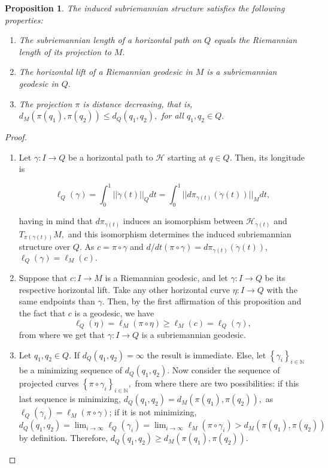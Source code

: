 \documentclass[12pt, letterpaper, reqno]{amsart}
\theoremstyle{definition}
\theoremstyle{plain}
\newtheorem{prop}{Proposition}
\theoremstyle{remark}
\begin{document}
\begin{prop}
	The induced subriemannian structure satisfies the following properties:
	\begin{enumerate}
		\item The subriemannian length of a horizontal path on $ Q $ equals the Riemannian length of its projection to $ M. $ 
		\item The horizontal lift of a Riemannian geodesic in $ M $ is a subriemannian geodesic in $ Q. $ 
		\item The projection $ \pi $ is distance decreasing, that is, $ d_M(\pi(q_1), \pi(q_2))\leq d_Q(q_1,q_2), $ for all $ q_1,q_2\in Q. $ 
	\end{enumerate}
\end{prop}
\begin{proof}
	\begin{enumerate}
		\item Let $ \gamma: I \rightarrow {Q} $ be a horizontal path to $ \mathcal{H} $ starting at $ q\in Q. $ Then, its longitude is 

		$$\ell_Q(\gamma) = \int_0^1 ||\dot{\gamma} (t) ||_{Q} dt = \int_0^1 || d\pi_{\gamma(t)}(\dot{\gamma}(t))||_M dt,$$ 

		having in mind that $d\pi_{\gamma(t)}$ induces an isomorphism between $ \mathcal{H}_{\gamma(t)} $ and $ T_{\pi(\gamma(t))} M,$ and this isomorphism determines the induced subriemannian structure over $ Q. $ As $c=\pi\circ\gamma$ and $ d/dt(\pi\circ\gamma) = d\pi_{\gamma(t)}(\dot{\gamma}(t)) $, $ \ell_Q(\gamma)=\ell_M(c). $  

		\item Suppose that $ c: I \rightarrow {M} $ is a Riemannian geodesic, and let $ \gamma: I \rightarrow {Q} $ be its respective horizontal lift. Take any other horizontal curve $ \eta: I \rightarrow {Q} $ with the same endpoints than $ \gamma. $ Then, by the first affirmation of this proposition and the fact that $ c $ is a geodesic, we have
			$$ \ell_Q(\eta) = \ell_M(\pi\circ \eta) \geq \ell_M(c) = \ell_Q(\gamma),  $$ 
		from where we get that $ \gamma: I \rightarrow {Q} $ is a subriemannian geodesic.

	\item Let $ q_1,q_2\in Q. $ If $ d_Q(q_1,q_2) = \infty $ the result is immediate. Else, let $ \left\{ \gamma_i \right\}_{i\in \mathbb{N}} $ be a minimizing sequence of $ d_Q(q_1,q_2). $ Now consider the sequence of projected curves $ \left\{ \pi\circ\gamma_i \right\}_{i\in \mathbb{N}}, $ from where there are two possibilities: if this last sequence is minimizing, $ d_Q(q_1, q_2) = d_M(\pi(q_1), \pi(q_2)),$ as $ \ell_Q(\gamma_i)=\ell_M(\pi\circ\gamma) $;  if it is not minimizing,  $d_Q(q_1,q_2) = \lim_{i \rightarrow \infty} \ell_Q(\gamma_i) = \lim_{i \rightarrow \infty} \ell_M(\pi\circ\gamma_i) > d_M(\pi(q_1),\pi(q_2))$ by definition. Therefore, $ d_Q(q_1,q_2)\geq d_M(\pi(q_1),\pi(q_2)).$
	\end{enumerate}
\end{proof}
\end{document}

